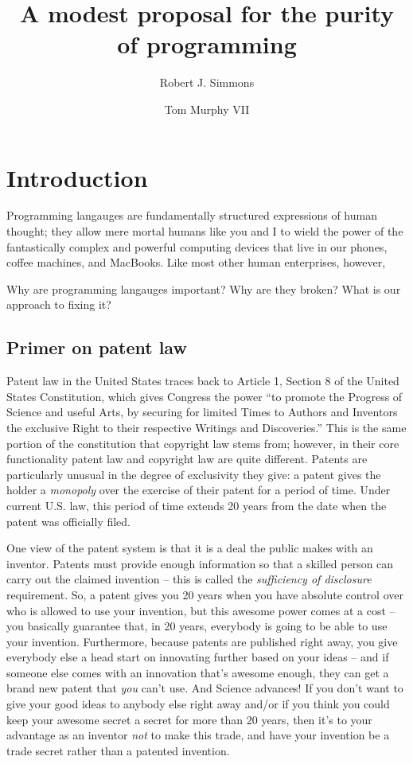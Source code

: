 \documentclass[acmtocl]%
{boviktrans}
\title{A modest proposal for the purity of programming}
\author{Robert J. Simmons \and Tom Murphy VII}
\begin{document}
\maketitle

\section{Introduction}

Programming langauges are fundamentally structured expressions of
human thought; they allow mere mortal humans like you and I to wield
the power of the fantastically complex and powerful computing devices
that live in our phones, coffee machines, and MacBooks. Like most
other human enterprises, however,

Why are programming langauges important? Why are they broken? What is
our approach to fixing it?

\subsection{Primer on patent law}

Patent law in the United States traces back to Article 1, Section 8 of
the United States Constitution, which gives Congress the power ``to
promote the Progress of Science and useful Arts, by securing for
limited Times to Authors and Inventors the exclusive Right to their
respective Writings and Discoveries.'' This is the same portion of the
constitution that copyright law stems from; however, in their core
functionality patent law and copyright law are quite
different. Patents are particularly unusual in the degree of
exclusivity they give: a patent gives the holder a {\it monopoly} over
the exercise of their patent for a period of time. Under current U.S.
law, this period of time extends 20 years from the date when the
patent was officially filed.

One view of the patent system is that it is a deal the public makes
with an inventor. Patents must provide enough information so that a
skilled person can carry out the claimed invention -- this is called
the {\it sufficiency of disclosure} requirement.  So, a patent gives
you 20 years when you have absolute control over who is allowed to use
your invention, but this awesome power comes at a cost -- you
basically guarantee that, in 20 years, everybody is going to be able
to use your invention. Furthermore, because patents are published
right away, you give everybody else a head start on innovating further
based on your ideas -- and if someone else comes with an innovation
that's awesome enough, they can get a brand new patent that {\it you}
can't use. And Science advances!  If you don't want to give your good
ideas to anybody else right away and/or if you think you could keep
your awesome secret a secret for more than 20 years, then it's to your
advantage as an inventor {\it not} to make this trade, and have your
invention be a trade secret rather than a patented invention.
\end{document}
